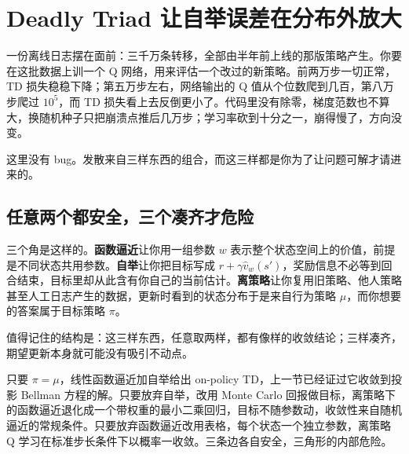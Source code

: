\section{Deadly Triad 让自举误差在分布外放大}
\label{sec:16-Control-and-Reinforcement-Learning/02-Reinforcement-Learning/06}

一份离线日志摆在面前：三千万条转移，全部由半年前上线的那版策略产生。你要在这批数据上训一个 Q 网络，用来评估一个改过的新策略。前两万步一切正常，TD 损失稳稳下降；第五万步左右，网络输出的 Q 值从个位数爬到几百，第八万步爬过 \(10^{5}\)，而 TD 损失看上去反倒更小了。代码里没有除零，梯度范数也不算大，换随机种子只把崩溃点推后几万步；学习率砍到十分之一，崩得慢了，方向没变。

这里没有 bug。发散来自三样东西的组合，而这三样都是你为了让问题可解才请进来的。

\subsection{任意两个都安全，三个凑齐才危险}

三个角是这样的。\textbf{函数逼近}让你用一组参数 \(w\) 表示整个状态空间上的价值，前提是不同状态共用参数。\textbf{自举}让你把目标写成 \(r+\gamma\widehat v_w(s')\)，奖励信息不必等到回合结束，目标里却从此含有你自己的当前估计。\textbf{离策略}让你复用旧策略、他人策略甚至人工日志产生的数据，更新时看到的状态分布于是来自行为策略 \(\mu\)，而你想要的答案属于目标策略 \(\pi\)。

值得记住的结构是：这三样东西，任意取两样，都有像样的收敛结论；三样凑齐，期望更新本身就可能没有吸引不动点。

只要 \(\pi=\mu\)，线性函数逼近加自举给出 on-policy TD，上一节已经证过它收敛到投影 Bellman 方程的解。只要放弃自举，改用 Monte Carlo 回报做目标，离策略下的函数逼近退化成一个带权重的最小二乘回归，目标不随参数动，收敛性来自随机逼近的常规条件。只要放弃函数逼近改用表格，每个状态一个独立参数，离策略 Q 学习在标准步长条件下以概率一收敛。三条边各自安全，三角形的内部危险。

